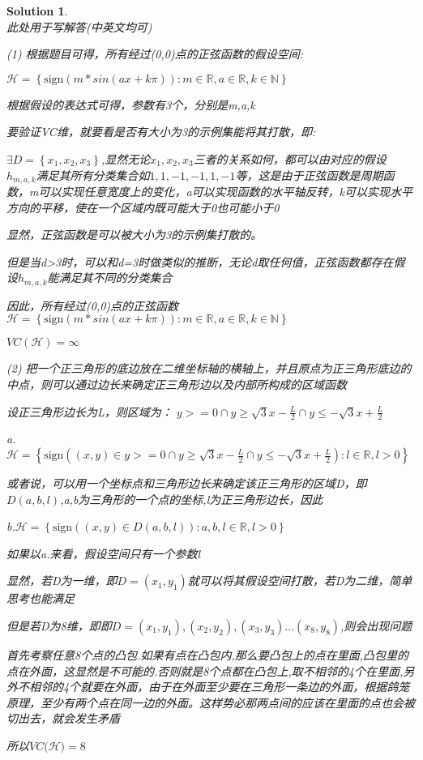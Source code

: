 \documentclass[a4paper,UTF8]{article}
\numberwithin{equation}{section}
\newtheorem*{mySol}{Solution}
\begin{document}
\begin{mySol}~\\
    此处用于写解答(中英文均可)
    
    (1)
    根据题目可得，所有经过(0,0)点的正弦函数的假设空间:
    
    $\mathcal{H}= \left\{ \text{sign}( m*sin(ax+k\pi )):m \in \mathbb{R},a \in \mathbb{R},k \in \mathbb{N}\right\}$
    
    根据假设的表达式可得，参数有3个，分别是m,a,k
    
    要验证VC维，就要看是否有大小为3的示例集能将其打散，即:
    
    $\exists D = \left\{ x_1,x_2,x_3\right\}$,显然无论$x_1,x_2,x_3$三者的关系如何，都可以由对应的假设$h_{m,a,k}$满足其所有分类集合如${1,1,-1},{-1,1,-1}$等，这是由于正弦函数是周期函数，m可以实现任意宽度上的变化，a可以实现函数的水平轴反转，k可以实现水平方向的平移，使在一个区域内既可能大于0也可能小于0
    
    显然，正弦函数是可以被大小为3的示例集打散的。
    
    但是当d>3时，可以和d=3时做类似的推断，无论d取任何值，正弦函数都存在假设$h_{m,a,k}$能满足其不同的分类集合
    
    因此，所有经过(0,0)点的正弦函数$\mathcal{H}= \left\{ \text{sign}( m*sin(ax+k\pi )):m \in \mathbb{R},a \in \mathbb{R},k \in \mathbb{N}\right\}$
    
    $VC(\mathcal{H}) = \infty$
    
    (2)
    把一个正三角形的底边放在二维坐标轴的横轴上，并且原点为正三角形底边的中点，则可以通过边长来确定正三角形边以及内部所构成的区域函数
    
    设正三角形边长为L，则区域为：
    $y>=0 \cap y \geq \sqrt{3}x-\frac{L}{2} \cap y \leq -\sqrt{3}x+\frac{L}{2}$
    
    a.$\mathcal{H}= \left\{ \text{sign}((x,y) \in y>=0 \cap y \geq \sqrt{3}x-\frac{L}{2} \cap y \leq -\sqrt{3}x+\frac{L}{2}):l \in \mathbb{R},l>0\right\}$
    
    或者说，可以用一个坐标点和三角形边长来确定该正三角形的区域D，即$D(a,b,l)$,a,b为三角形的一个点的坐标,l为正三角形边长，因此
    
    b.$\mathcal{H}= \left\{ \text{sign}((x,y) \in D(a,b,l)):a,b,l \in \mathbb{R},l>0\right\}$
    
    如果以a.来看，假设空间只有一个参数{l}
    
    显然，若D为一维，即$D = {(x_1,y_1)}$就可以将其假设空间打散，若D为二维，简单思考也能满足
    
    但是若D为8维，即即$D = {(x_1,y_1),(x_2,y_2),(x_3,y_3)...(x_8,y_8)}$,则会出现问题
    
    首先考察任意8个点的凸包.如果有点在凸包内,那么要凸包上的点在里面,凸包里的点在外面，这显然是不可能的.否则就是8个点都在凸包上,取不相邻的4个在里面,另外不相邻的4个就要在外面，由于在外面至少要在三角形一条边的外面，根据鸽笼原理，至少有两个点在同一边的外面。这样势必那两点间的应该在里面的点也会被切出去，就会发生矛盾
    
    所以$VC(\mathcal{H)} = 8$
    
    
    
\end{mySol}
\end{document}
